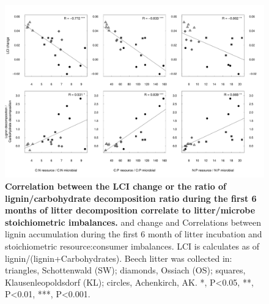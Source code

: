 \documentclass[10pt]{article}
\begin{document}
\begin{flushleft}
\newpage
\begin{figure}[h!]
\vspace*{2mm}
\begin{center}
\includegraphics{ligpaper-graphcorr}
\end{center}
\caption{
{\bf Correlation between the LCI change or the ratio of lignin/carbohydrate decomposition ratio during the first 6 months of litter decomposition correlate to litter/microbe stoichiometric imbalances.} and change and Correlations between lignin accumulation during the first 6 month of litter incubation and stoichiometric resource:consumer imbalances. LCI is calculates as of lignin/(lignin+Carbohydrates).  Beech litter was collected in: triangles, Schottenwald (SW); diamonds, Ossiach (OS); squares, Klausenleopoldsdorf (KL); circles, Achenkirch, AK. *, P\textless 0.05, **, P\textless 0.01, ***, P\textless 0.001.}
\label{fig:cor1}
\end{figure}



\end{flushleft}
\end{document}

